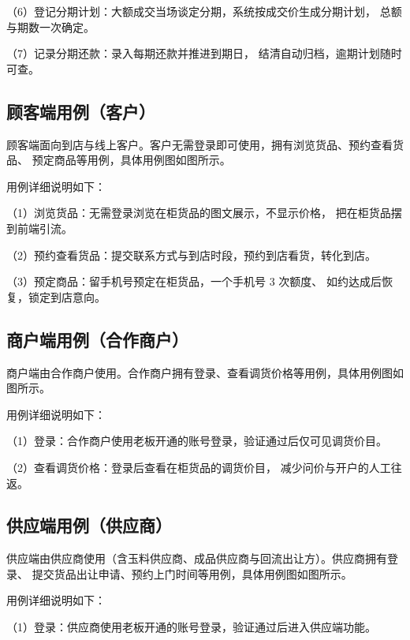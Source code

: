 \noindent（6）登记分期计划：大额成交当场谈定分期，系统按成交价生成分期计划，
总额与期数一次确定。

\noindent（7）记录分期还款：录入每期还款并推进到期日，
结清自动归档，逾期计划随时可查。

\subsection{顾客端用例（客户）}

顾客端面向到店与线上客户。客户无需登录即可使用，拥有浏览货品、预约查看货品、
预定商品等用例，具体用例图如图所示。


用例详细说明如下：

\noindent（1）浏览货品：无需登录浏览在柜货品的图文展示，不显示价格，
把在柜货品摆到前端引流。

\noindent（2）预约查看货品：提交联系方式与到店时段，预约到店看货，转化到店。

\noindent（3）预定商品：留手机号预定在柜货品，一个手机号 3 次额度、
如约达成后恢复，锁定到店意向。

\subsection{商户端用例（合作商户）}

商户端由合作商户使用。合作商户拥有登录、查看调货价格等用例，具体用例图如图所示。


用例详细说明如下：

\noindent（1）登录：合作商户使用老板开通的账号登录，验证通过后仅可见调货价目。

\noindent（2）查看调货价格：登录后查看在柜货品的调货价目，
减少问价与开户的人工往返。

\subsection{供应端用例（供应商）}

供应端由供应商使用（含玉料供应商、成品供应商与回流出让方）。供应商拥有登录、
提交货品出让申请、预约上门时间等用例，具体用例图如图所示。


用例详细说明如下：

\noindent（1）登录：供应商使用老板开通的账号登录，验证通过后进入供应端功能。


